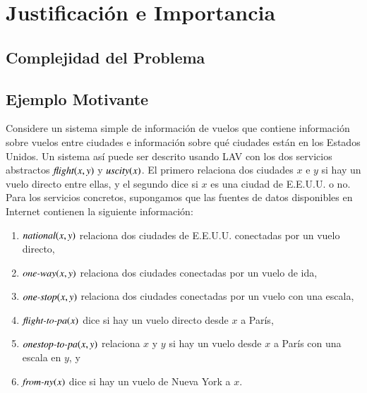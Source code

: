 \section{Justificación e Importancia}

\subsection{Complejidad del Problema}

\cite{lenzerini:dataintegration}

\subsection{Ejemplo Motivante}

\newcommand{\flight}{\text{\it flight}}
\newcommand{\UScity}{\text{\it uscity}}
\newcommand{\national}{\text{\it national}}
\newcommand{\oneway}{\text{\it one-way}}
\newcommand{\onestop}{\text{\it one-stop}}
\newcommand{\flightPA}{\text{\it flight-to-pa}}
\newcommand{\onestopPA}{\text{\it onestop-to-pa}}
\newcommand{\fromNY}{\text{\it from-ny}}
\newcommand{\PA}{\text{PA}}
\newcommand{\NY}{\text{NY}}
\newcommand{\AL}{\text{AL}}

Considere un sistema simple de información de vuelos que contiene información
sobre vuelos entre ciudades e información sobre qué ciudades están en los
Estados Unidos. Un sistema así puede ser descrito usando LAV con los dos servicios
abstractos $\flight(x,y)$ y $\UScity(x)$. El primero relaciona dos ciudades $x$ e $y$ si
hay un vuelo directo entre ellas, y el segundo dice si $x$ es una ciudad de
E.E.U.U.  o no. Para los servicios concretos, supongamos que las fuentes de
datos disponibles en Internet contienen la siguiente información:

\begin{enumerate}[--]
\item $\national(x,y)$ relaciona dos ciudades de E.E.U.U. conectadas por un vuelo directo,
\item $\oneway(x,y)$ relaciona dos ciudades conectadas por un vuelo de ida,
\item $\onestop(x,y)$ relaciona dos ciudades conectadas por un vuelo con una escala,
\item $\flightPA(x)$ dice si hay un vuelo directo desde $x$ a París,
\item $\onestopPA(x,y)$ relaciona $x$ y $y$ si hay un vuelo desde $x$ a París con una escala en $y$, y
\item $\fromNY(x)$ dice si hay un vuelo de Nueva York a $x$.
\end{enumerate}

